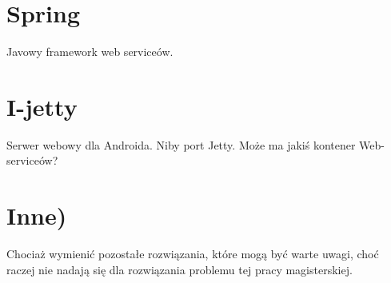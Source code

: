 
\section{Spring}
Javowy framework web serviceów.


\section{I-jetty}
Serwer webowy dla Androida. Niby port Jetty. Może ma jakiś kontener Web-serviceów?

\section{Inne)}
Chociaż wymienić pozostałe rozwiązania, które mogą być warte uwagi, choć raczej nie nadają się dla rozwiązania problemu tej pracy magisterskiej.

